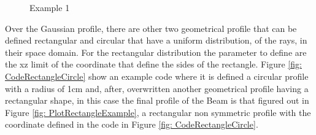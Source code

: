 \begin{figure}[H]
%
\centering
%
\quad
%
%
\caption{Example 1}
\label{fig :p1}
%
\end{figure}
Over the Gaussian profile, there are other two geometrical profile that can be defined rectangular and circular that have a uniform distribution, of the rays, in their space domain. For the rectangular distribution the parameter to define are the xz limit of the coordinate that define the sides of the rectangle. Figure \ref{fig: CodeRectangleCircle} show an example code where it is defined a circular profile with a radius of 1cm and, after, overwritten another geometrical profile having a rectangular shape, in this case the final profile of the Beam is that figured out in Figure \ref{fig: PlotRectangleExample}, a rectangular non symmetric profile with the coordinate defined in the code in Figure \ref{fig: CodeRectangleCircle}.
%
